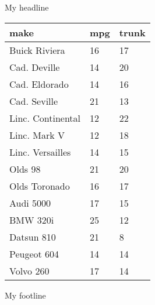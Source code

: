 \documentclass{article}
\begin{document}
\begin{center}
My headline
\end{center}
\begin{table}[h] \centering
{}

\begin{tabularx}{\linewidth}{@{}lCC@{}}

\toprule
{make}&{mpg}&{trunk} \tabularnewline
\midrule \addlinespace[\belowrulesep]
Buick Riviera&16&17 \tabularnewline
Cad. Deville&14&20 \tabularnewline
Cad. Eldorado&14&16 \tabularnewline
Cad. Seville&21&13 \tabularnewline
Linc. Continental&12&22 \tabularnewline
Linc. Mark V&12&18 \tabularnewline
Linc. Versailles&14&15 \tabularnewline
Olds 98&21&20 \tabularnewline
Olds Toronado&16&17 \tabularnewline
Audi 5000&17&15 \tabularnewline
BMW 320i&25&12 \tabularnewline
Datsun 810&21&8 \tabularnewline
Peugeot 604&14&14 \tabularnewline
Volvo 260&17&14 \tabularnewline
\bottomrule 

\end{tabularx}
\end{table}
My footline
\end{document}
